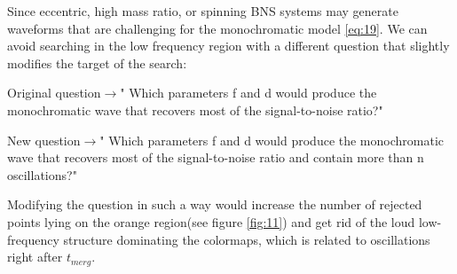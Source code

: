 \FloatBarrier



Since eccentric, high mass ratio, or spinning BNS systems may generate waveforms that are challenging for the monochromatic model \ref{eq:19}. We can avoid searching in the low frequency region with a different question that slightly modifies the target of the search:

Original question$\rightarrow$" Which parameters f and d would produce the monochromatic wave that recovers most of the signal-to-noise ratio?"

New question$\rightarrow$" Which parameters f and d would produce the monochromatic wave that recovers most of the signal-to-noise ratio and contain more than n oscillations?"


Modifying the question in such a way would increase the number of rejected points lying on the orange region(see figure \ref{fig:11}) and get rid of the loud low-frequency structure dominating the colormaps, which is related to oscillations right after $t_{merg}$.


